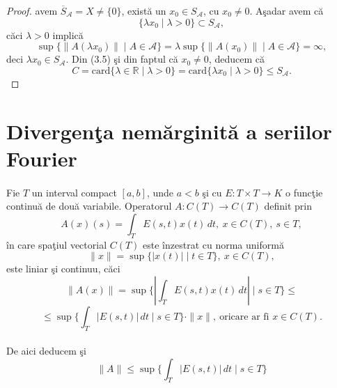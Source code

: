 \documentclass[a4paper,openany,12pt]{report}
\begin{document}
\begin{proof}
avem $\overline{S}_{\mathcal{A}} = X \neq \{0\}$, exist\u a un $x_0 \in S_{\mathcal{A}}$, cu $x_0 \neq 0$. A\c sadar avem c\u a
\begin{equation}
\{\lambda x_0 \mid \lambda >0\}\subset S_{\mathcal{A}},
\end{equation}
c\u aci $\lambda>0$ implic\u a
\begin{equation*}
\sup\big\{ \|A(\lambda x_0)\| \mid A \in \mathcal{A}\big\} = \lambda\sup\big\{ \|A(x_0)\| \mid A \in \mathcal{A}\big\} = \infty,
\end{equation*}
deci $\lambda x_0 \in S_{\mathcal{A}} $. Din (3.5) \c si din faptul c\u a $x_0 \neq 0$, deducem c\u a
\begin{equation*}
C = \text{card}\{\lambda \in \mathbb{R} \mid \lambda > 0\} = \text{card} \{\lambda x_0 \mid \lambda >0\} \leq S_{\mathcal{A}}.
\end{equation*}
\end{proof}


\section{Divergen\c ta nem\u arginit\u a a seriilor Fourier}
\paragraph*{}Fie $T$ un interval compact $[a, b]$, unde $a<b$ \c si cu $E:T\times T \rightarrow K$ o func\c tie continu\u a de dou\u a variabile. Operatorul $A:C(T)\rightarrow C(T)$ definit prin
\begin{equation}
A(x)(s) = \int_T E(s,t)x(t)\, dt, \: x \in C(T),\: s \in T,
\end{equation}
\^ in care spa\c tiul vectorial $C(T)$ este \^ inzestrat cu norma uniform\u a 
\begin{equation*}
\|x\| =\sup\{|x(t)| \mid t \in T\}, \: x\in C(T),
\end{equation*}
este liniar \c si continuu, c\u aci 
\begin{equation*}
\|A(x)\| = \sup \bigg\{ \left| \int_T E(s,t)x(t)\, dt \right| \mid s \in T \bigg\} \leq
\end{equation*}
\begin{equation*}
\leq \sup \bigg\{  \int_T \left| E(s,t)\right|\, dt \mid s \in T \bigg\}\cdot \|x\|, \: \text{oricare ar fi } x \in C(T).
\end{equation*}
\paragraph*{} De aici deducem \c si 
\begin{equation}
\|A\| \leq \sup \bigg\{  \int_T \left| E(s,t)\right|\, dt \mid s \in T \bigg\}
\end{equation}
\end{document}
